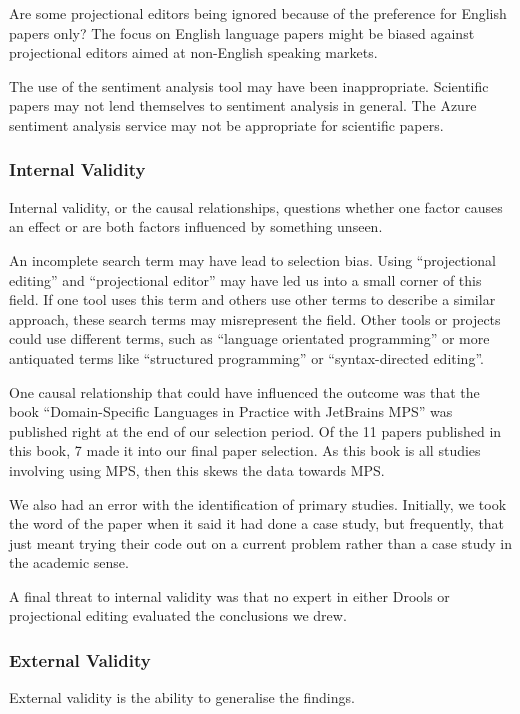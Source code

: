 Are some projectional editors being ignored because of the preference for English papers only?
The focus on English language papers might be biased against projectional editors aimed at non-English speaking markets.

The use of the sentiment analysis tool may have been inappropriate.
Scientific papers may not lend themselves to sentiment analysis in general.
The Azure sentiment analysis service may not be appropriate for scientific papers.

\subsubsection{Internal Validity}
Internal validity, or the causal relationships, questions whether one factor causes an effect or are both factors influenced by something unseen.

An incomplete search term may have lead to selection bias.  
Using ``projectional editing'' and ``projectional editor'' may have led us into a small corner of this field.
If one tool uses this term and others use other terms to describe a similar approach, these search terms may misrepresent the field.
Other tools or projects could use different terms, such as ``language orientated programming'' or more antiquated terms like ``structured programming'' or ``syntax-directed editing''.

One causal relationship that could have influenced the outcome was that the book ``Domain-Specific Languages in Practice with JetBrains MPS'' was published right at the end of our selection period.
Of the 11 papers published in this book, 7 made it into our final paper selection.
As this book is all studies involving using MPS, then this skews the data towards MPS.

We also had an error with the identification of primary studies. 
Initially, we took the word of the paper when it said it had done a case study, but frequently, that just meant trying their code out on a current problem rather than a case study in the academic sense.

A final threat to internal validity was that no expert in either Drools or projectional editing evaluated the conclusions we drew.

\subsubsection{External Validity}
External validity is the ability to generalise the findings.

